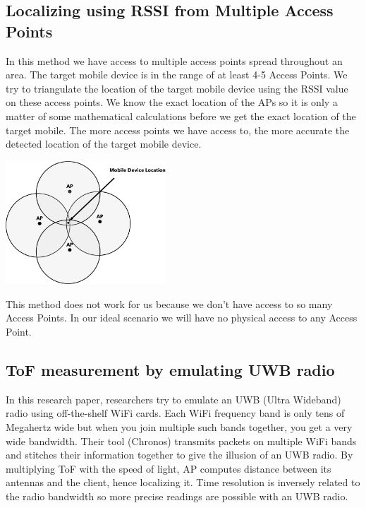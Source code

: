\documentclass[letterpaper, 10 pt, conference]{ieeeconf}  %
\begin{document}
\subsection{Localizing using RSSI from Multiple Access Points}

In this method we have access to multiple access points spread throughout an area. The target mobile device is in the range of at least 4-5 Access Points. We try to triangulate the location of the target mobile device using the RSSI value on these access points. We know the exact location of the APs so it is only a matter of some mathematical calculations before we get the exact location of the target mobile. The more access points we have access to, the more accurate the detected location of the target mobile device.

\begin{center}
\includegraphics[width=6cm]{Slice_2.png}
\end{center}

This method does not work for us because we don’t have access to so many Access Points. In our ideal scenario we will have no physical access to any Access Point. 

\subsection{ToF measurement by emulating UWB radio}

In this research paper, researchers try to emulate an UWB (Ultra Wideband) radio using off-the-shelf WiFi cards. Each WiFi frequency band is only tens of Megahertz wide but when you join multiple such bands together, you get a very wide bandwidth. Their tool (Chronos) transmits packets on multiple WiFi bands and stitches their information together to give the illusion of an UWB radio. 
By multiplying ToF with the speed of light, AP computes distance between its antennas and the client, hence localizing it. Time resolution is inversely related to the radio bandwidth so more precise readings are possible with an UWB radio.
\end{document}
